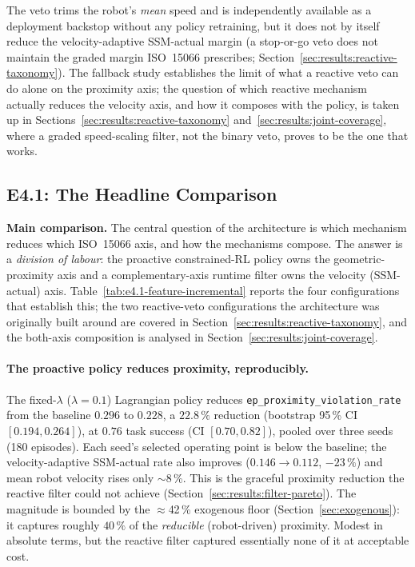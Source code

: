 \documentclass[11pt,a4paper]{report}
\newcommand{\ssm}{SSM}
\newcommand{\iso}{ISO~15066}
\begin{document}
The veto trims the robot's \emph{mean} speed and is independently
available as a deployment backstop without any policy retraining, but
it does not by itself reduce the velocity-adaptive \ssm{}-actual margin
(a stop-or-go veto does not maintain the graded margin \iso{}
prescribes; Section~\ref{sec:results:reactive-taxonomy}). The fallback
study establishes the limit of what a reactive veto can do alone on
the proximity axis; the question of which reactive mechanism actually
reduces the velocity axis, and how it composes with the policy, is
taken up in Sections~\ref{sec:results:reactive-taxonomy}
and~\ref{sec:results:joint-coverage}, where a graded speed-scaling
filter, not the binary veto, proves to be the one that works.

\subsection{E4.1: The Headline Comparison}
\label{sec:results:headline-feature-table}

\textbf{Main comparison.} The central question of the
architecture is which mechanism reduces which \iso{} axis, and how the
mechanisms compose. The answer is a \emph{division of labour}: the
proactive constrained-RL policy owns the geometric-proximity axis and a
complementary-axis runtime filter owns the velocity (\ssm{}-actual)
axis. Table~\ref{tab:e4.1-feature-incremental} reports the four
configurations that establish this; the two reactive-veto
configurations the architecture was originally built around are
covered in Section~\ref{sec:results:reactive-taxonomy}, and the
both-axis composition is analysed in
Section~\ref{sec:results:joint-coverage}.

\paragraph{The proactive policy reduces proximity, reproducibly.}
The fixed-$\lambda$ ($\lambda = 0.1$) Lagrangian policy reduces
\texttt{ep\_proximity\_violation\_rate} from the baseline $0.296$ to
$0.228$, a $22.8\,\%$ reduction (bootstrap 95\,\% CI $[0.194, 0.264]$),
at $0.76$ task success (CI $[0.70, 0.82]$), pooled over three seeds
(180 episodes). Each
seed's selected operating point is below the baseline; the
velocity-adaptive \ssm{}-actual rate also improves
($0.146 \rightarrow 0.112$, $-23\,\%$) and mean robot velocity rises
only $\sim$8\,\%. This is the graceful proximity reduction the reactive
filter could not achieve (Section~\ref{sec:results:filter-pareto}).
The magnitude is bounded by the $\approx$42\,\% exogenous floor
(Section~\ref{sec:exogenous}): it captures roughly $40\,\%$ of the
\emph{reducible} (robot-driven) proximity. Modest in absolute terms,
but the reactive filter captured essentially none of it at acceptable
cost.
\end{document}
